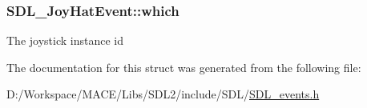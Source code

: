 \subsubsection[{\texorpdfstring{which}{which}}]{ S\+D\+L\+\_\+\+Joy\+Hat\+Event\+::which}\hypertarget{struct_s_d_l___joy_hat_event_ac9d9bb179f9116d16b3da47cacd74b55}{}\label{struct_s_d_l___joy_hat_event_ac9d9bb179f9116d16b3da47cacd74b55}
The joystick instance id 

The documentation for this struct was generated from the following file\+:\begin{DoxyCompactItemize}
\item 
D\+:/\+Workspace/\+M\+A\+C\+E/\+Libs/\+S\+D\+L2/include/\+S\+D\+L/\hyperlink{_s_d_l__events_8h}{S\+D\+L\+\_\+events.\+h}\end{DoxyCompactItemize}
